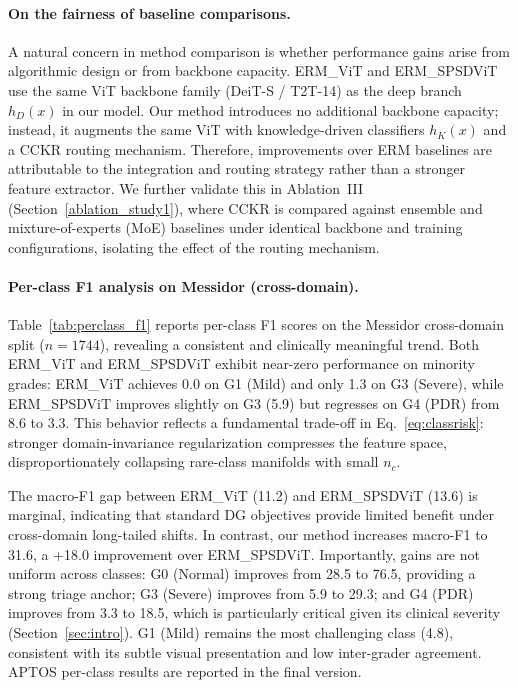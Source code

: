 \documentclass{article}
\begin{document}
\paragraph{On the fairness of baseline comparisons.}
A natural concern in method comparison is whether performance gains arise from algorithmic design or from backbone capacity. ERM\_ViT and ERM\_SPSDViT use the same ViT backbone family (DeiT-S / T2T-14) as the deep branch $h_D(x)$ in our model. Our method introduces no additional backbone capacity; instead, it augments the same ViT with knowledge-driven classifiers $h_K(x)$ and a CCKR routing mechanism. Therefore, improvements over ERM baselines are attributable to the integration and routing strategy rather than a stronger feature extractor. We further validate this in Ablation~III (Section~\ref{ablation_study1}), where CCKR is compared against ensemble and mixture-of-experts (MoE) baselines under identical backbone and training configurations, isolating the effect of the routing mechanism.

\paragraph{Per-class F1 analysis on Messidor (cross-domain).}
Table~\ref{tab:perclass_f1} reports per-class F1 scores on the Messidor cross-domain split ($n=1744$), revealing a consistent and clinically meaningful trend. Both ERM\_ViT and ERM\_SPSDViT exhibit near-zero performance on minority grades: ERM\_ViT achieves 0.0 on G1 (Mild) and only 1.3 on G3 (Severe), while ERM\_SPSDViT improves slightly on G3 (5.9) but regresses on G4 (PDR) from 8.6 to 3.3. This behavior reflects a fundamental trade-off in Eq.~\eqref{eq:classrisk}: stronger domain-invariance regularization compresses the feature space, disproportionately collapsing rare-class manifolds with small $n_c$.

The macro-F1 gap between ERM\_ViT (11.2) and ERM\_SPSDViT (13.6) is marginal, indicating that standard DG objectives provide limited benefit under cross-domain long-tailed shifts. In contrast, our method increases macro-F1 to 31.6, a +18.0 improvement over ERM\_SPSDViT. Importantly, gains are not uniform across classes: G0 (Normal) improves from 28.5 to 76.5, providing a strong triage anchor; G3 (Severe) improves from 5.9 to 29.3; and G4 (PDR) improves from 3.3 to 18.5, which is particularly critical given its clinical severity (Section~\ref{sec:intro}). G1 (Mild) remains the most challenging class (4.8), consistent with its subtle visual presentation and low inter-grader agreement. APTOS per-class results are reported in the final version.
\newpage
\end{document}
